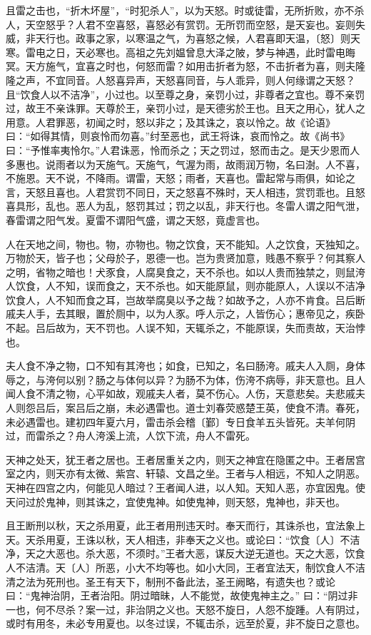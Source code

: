 \documentclass[]{article}
\begin{document}
且雷之击也，``折木坏屋''，``时犯杀人''，以为天怒。时或徒雷，无所折败，亦不杀人，天空怒乎？人君不空喜怒，喜怒必有赏罚。无所罚而空怒，是天妄也。妄则失威，非天行也。政事之家，以寒温之气，为喜怒之候，人君喜即天温，〔怒〕则天寒。雷电之日，天必寒也。高祖之先刘媪曾息大泽之陂，梦与神遇，此时雷电晦冥。天方施气，宜喜之时也，何怒而雷？如用击折者为怒，不击折者为喜，则夫隆隆之声，不宜同音。人怒喜异声，天怒喜同音，与人乖异，则人何缘谓之天怒？且``饮食人以不洁净''，小过也。以至尊之身，亲罚小过，非尊者之宜也。尊不亲罚过，故王不亲诛罪。天尊於王，亲罚小过，是天德劣於王也。且天之用心，犹人之用意。人君罪恶，初闻之时，怒以非之；及其诛之，哀以怜之。故《论语》曰：``如得其情，则哀怜而勿喜。''纣至恶也，武王将诛，哀而怜之。故《尚书》曰：``予惟率夷怜尔。''人君诛恶，怜而杀之；天之罚过，怒而击之。是天少恩而人多惠也。说雨者以为天施气。天施气，气渥为雨，故雨润万物，名曰澍。人不喜，不施恩。天不说，不降雨。谓雷，天怒；雨者，天喜也。雷起常与雨俱，如论之言，天怒且喜也。人君赏罚不同日，天之怒喜不殊时，天人相违，赏罚乖也。且怒喜具形，乱也。恶人为乱，怒罚其过；罚之以乱，非天行也。冬雷人谓之阳气泄，春雷谓之阳气发。夏雷不谓阳气盛，谓之天怒，竟虚言也。

人在天地之间，物也。物，亦物也。物之饮食，天不能知。人之饮食，天独知之。万物於天，皆子也；父母於子，恩德一也。岂为贵贤加意，贱愚不察乎？何其察人之明，省物之暗也！犬豕食，人腐臭食之，天不杀也。如以人贵而独禁之，则鼠洿人饮食，人不知，误而食之，天不杀也。如天能原鼠，则亦能原人，人误以不洁净饮食人，人不知而食之耳，岂故举腐臭以予之哉？如故予之，人亦不肯食。吕后断戚夫人手，去其眼，置於厕中，以为人豕。呼人示之，人皆伤心；惠帝见之，疾卧不起。吕后故为，天不罚也。人误不知，天辄杀之，不能原误，失而责故，天治悖也。

夫人食不净之物，口不知有其洿也；如食，已知之，名曰肠洿。戚夫人入厕，身体辱之，与洿何以别？肠之与体何以异？为肠不为体，伤洿不病辱，非天意也。且人闻人食不清之物，心平如故，观戚夫人者，莫不伤心。人伤，天意悲矣。夫悲戚夫人则怨吕后，案吕后之崩，未必遇雷也。道士刘春荧惑楚王英，使食不清。春死，未必遇雷也。建初四年夏六月，雷击杀会稽〔鄞〕专日食羊五头皆死。夫羊何阴过，而雷杀之？舟人洿溪上流，人饮下流，舟人不雷死。

天神之处天，犹王者之居也。王者居重关之内，则天之神宜在隐匿之中。王者居宫室之内，则天亦有太微、紫宫、轩辕、文昌之坐。王者与人相远，不知人之阴恶。天神在四宫之内，何能见人暗过？王者闻人进，以人知。天知人恶，亦宜因鬼。使天问过於鬼神，则其诛之，宜使鬼神。如使鬼神，则天怒，鬼神也，非天也。

且王断刑以秋，天之杀用夏，此王者用刑违天时。奉天而行，其诛杀也，宜法象上天。天杀用夏，王诛以秋，天人相违，非奉天之义也。或论曰：``饮食〔人〕不洁净，天之大恶也。杀大恶，不须时。''王者大恶，谋反大逆无道也。天之大恶，饮食人不洁清。天〔人〕所恶，小大不均等也。如小大同，王者宜法天，制饮食人不洁清之法为死刑也。圣王有天下，制刑不备此法，圣王阙略，有遗失也？或论曰：``鬼神治阴，王者治阳。阴过暗昧，人不能觉，故使鬼神主之。''
曰：``阴过非一也，何不尽杀？案一过，非治阴之义也。天怒不旋日，人怨不旋踵。人有阴过，或时有用冬，未必专用夏也。以冬过误，不辄击杀，远至於夏，非不旋日之意也。
\end{document}
